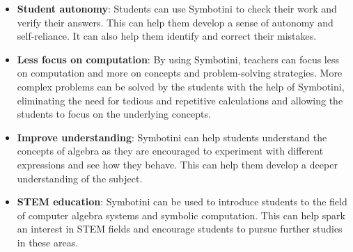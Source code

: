 \begin{itemize}
    \item \textbf{Student autonomy}: Students can use Symbotini to check their work and verify their answers. This can help them develop a sense of autonomy and self-reliance. It can also help them identify and correct their mistakes.
    \item \textbf{Less focus on computation}: By using Symbotini, teachers can focus less on computation and more on concepts and problem-solving strategies. More complex problems can be solved by the students with the help of Symbotini, eliminating the need for tedious and repetitive calculations and allowing the students to focus on the underlying concepts.
    \item \textbf{Improve understanding}: Symbotini can help students understand the concepts of algebra as they are encouraged to experiment with different expressions and see how they behave. This can help them develop a deeper understanding of the subject.
    \item \textbf{STEM education}: Symbotini can be used to introduce students to the field of computer algebra systems and symbolic computation. This can help spark an interest in STEM fields and encourage students to pursue further studies in these areas.
\end{itemize}
